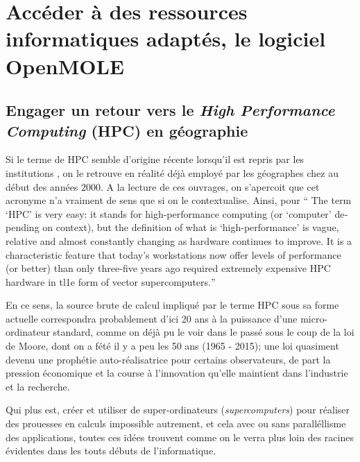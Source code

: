 
\newcommand\litem[1]{\item{\bfseries #1,\enspace}}

\section{Accéder à des ressources informatiques adaptés, le logiciel OpenMOLE}
\label{sec:openMOLE}

\subsection{Engager un retour vers le \textit{High Performance Computing} (HPC) en géographie}

Si le terme de HPC semble d'origine récente lorsqu'il est repris par les institutions \autocite{HPCHorizon2020}, on le retrouve en réalité déjà employé par les géographes chez \textcites{Turton1998, Openshaw2000, Openshaw2000b} au début des années 2000. A la lecture de ces ouvrages, on s'apercoit que cet acronyme n'a vraiment de sens que si on le contextualise. Ainsi, pour \textcite{Openshaw2000} \foreignquote{english}{ The term \enquote{HPC} is very easy: it stands for high-performance computing (or \enquote{computer} depending on context), but the definition of what is \enquote{high-performance} is vague, relative and almost constantly changing as hardware continues to improve. It is a characteristic feature that today's workstations now offer levels of performance (or better) than only three-five years ago required extremely expensive HPC hardware in tl1e form of vector supercomputers.}

En ce sens, la source brute de calcul impliqué par le terme HPC sous sa forme actuelle correspondra probablement d'ici 20 ans à la puissance d'une micro-ordinateur standard, comme on déjà pu le voir dans le passé sous le coup de la loi de Moore, dont on a fété il y a peu les 50 ans (1965 - 2015); une loi quasiment devenu une prophétie auto-réalisatrice pour certains observateurs, de part la pression économique et la course à l'innovation qu'elle maintient dans l'industrie et la recherche. 

Qui plus est, créer et utiliser de super-ordinateurs (\textit{supercomputers}) pour réaliser des prouesses en calculs impossible autrement, et cela avec ou sans paralléllisme des applications, toutes ces idées trouvent comme on le verra plus loin des racines évidentes dans les touts débuts de l'informatique.

